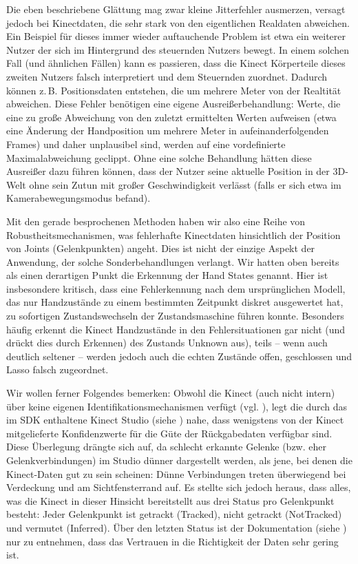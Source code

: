 	Die eben beschriebene Glättung mag zwar kleine Jitterfehler ausmerzen, versagt jedoch bei Kinectdaten, die sehr stark von den eigentlichen Realdaten abweichen. Ein Beispiel für dieses immer wieder auftauchende Problem ist etwa ein weiterer Nutzer der sich im Hintergrund des steuernden Nutzers bewegt. In einem solchen Fall (und ähnlichen Fällen) kann es passieren, dass die Kinect Körperteile dieses zweiten Nutzers falsch interpretiert und dem Steuernden zuordnet. Dadurch können z.\,B. Positionsdaten entstehen, die um mehrere Meter von der Realtität abweichen. Diese Fehler benötigen eine eigene Ausreißerbehandlung: Werte, die eine zu große Abweichung von den zuletzt ermittelten Werten aufweisen (etwa eine Änderung der Handposition um mehrere Meter in aufeinanderfolgenden Frames) und daher unplausibel sind, werden auf eine vordefinierte Maximalabweichung geclippt. Ohne eine solche Behandlung hätten diese Ausreißer dazu führen können, dass der Nutzer seine aktuelle Position in der 3D-Welt ohne sein Zutun mit großer Geschwindigkeit verlässt (falls er sich etwa im Kamerabewegungsmodus befand).\par 
	Mit den gerade besprochenen Methoden haben wir also eine Reihe von Robustheitsmechanismen, was fehlerhafte Kinectdaten hinsichtlich der Position von Joints (Gelenkpunkten) angeht. Dies ist nicht der einzige Aspekt der Anwendung, der solche Sonderbehandlungen verlangt. Wir hatten oben bereits als einen derartigen Punkt die Erkennung der \glqq Hand States\grqq{} genannt. Hier ist insbesondere kritisch, dass eine Fehlerkennung nach dem ursprünglichen Modell, das nur Handzustände zu einem bestimmten Zeitpunkt diskret ausgewertet hat, zu sofortigen Zustandswechseln der Zustandsmaschine führen konnte. Besonders häufig erkennt die Kinect Handzustände in den Fehlersituationen gar nicht (und drückt dies durch \glqq Erkennen\grqq{}) des Zustands \glqq{}Unknown\grqq{} aus), teils -- wenn auch deutlich seltener -- werden jedoch auch die \glqq echten\grqq{} Zustände \glqq offen\grqq{}, \glqq geschlossen\grqq{} und \glqq Lasso\grqq{} falsch zugeordnet.\par 
	Wir wollen ferner Folgendes bemerken: Obwohl die Kinect (auch nicht intern) über keine eigenen Identifikationsmechanismen verfügt (vgl. \cite{bodyprop}), legt die durch das im SDK enthaltene Kinect Studio (siehe \cite{kinectsdk}) nahe, dass wenigstens von der Kinect mitgelieferte Konfidenzwerte für die Güte der Rückgabedaten verfügbar sind. Diese Überlegung drängte sich auf, da schlecht erkannte Gelenke (bzw. eher Gelenkverbindungen) im Studio dünner dargestellt werden, als jene, bei denen die Kinect-Daten gut zu sein scheinen: Dünne Verbindungen treten überwiegend bei Verdeckung und am Sichtfensterrand auf. Es stellte sich jedoch heraus, dass alles, was die Kinect in dieser Hinsicht bereitstellt aus drei Status pro Gelenkpunkt besteht: Jeder Gelenkpunkt ist getrackt (\glqq Tracked\grqq), nicht getrackt (\glqq NotTracked\grqq) und vermutet (\glqq Inferred\grqq). Über den letzten Status ist der Dokumentation (siehe \cite{trackingstate}) nur zu entnehmen, dass das Vertrauen in die Richtigkeit der Daten \glqq sehr gering\grqq{} ist.
